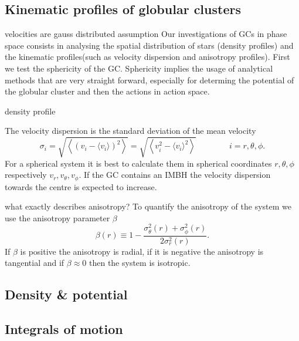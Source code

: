 \subsection{Kinematic profiles of globular clusters}\label{kin_prof_theory}
\color{red} velocities are gauss distributed assumption \color{black}
Our investigations of \acp{GC} in phase space consists in analysing the spatial distribution of stars (density profiles) and the kinematic profiles(such as velocity dispersion and anisotropy profiles). First we test the sphericity of the \ac{GC}. Sphericity implies the usage of analytical methods that are very straight forward, especially for determing the potential of the globular cluster and then the actions in action space.\par \color{red} density profile \color{black} \par The velocity dispersion is the standard deviation of the mean velocity 
\begin{equation}
\sigma_i=\sqrt{\left\langle(v_i-\langle v_i\rangle)^2\right\rangle}=\sqrt{\left\langle v_i^2-\langle v_i\rangle^2\right\rangle} \qquad\qquad i=r,\theta,\phi.
\end{equation} For a spherical system it is best to calculate them in spherical coordinates \(r,\theta,\phi\) respectively \(v_r,v_{\theta},v_{\phi}\). If the \ac{GC} contains an \ac{IMBH} the velocity dispersion towards the centre is expected to increase. 
\par \color{red} what exactly describes anisotropy? \color{black} To quantify the anisotropy of the system we use the anisotropy parameter \(\beta\) 
\begin{equation}
\beta(r)\equiv1-\frac{\sigma_\theta ^2(r)+\sigma_\phi ^2(r)}{2\sigma_r ^2(r)}.
\end{equation} If \(\beta\) is positive the anisotropy is radial, if it is negative the anisotropy is tangential and if \(\beta\approx0\) then the system is isotropic.
\subsection{Density \& potential}\label{dens_pot_theory}
\subsection{Integrals of motion}\label{int_of_motion_theory}
